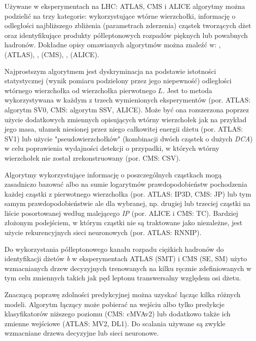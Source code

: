 Używane w eksperymentach na LHC: ATLAS, CMS i ALICE algorytmy można podzielić na trzy kategorie: wykorzystujące wtórne wierzchołki,  informację o odległości najbliższego zbliżenia (parametrach zderzenia)  cząstek tworzących dżet oraz identyfikujące produkty półleptonowych rozpadów pięknych lub powabnych hadronów. Dokładne opisy omawianych algorytmów można znaleźć w: \cite{Aad:2015ydr}, \cite{Sirunyan:2017ezt} (ATLAS), \cite{Chatrchyan:2012jua}, \cite{Sirunyan:2017ezt} (CMS), \cite{Feldkamp:2013cya}, \cite{Haake:2017dpr} (ALICE).

Najprostszym algorytmem jest dyskryminacja na podstawie istotności statystycznej (wynik pomiaru podzielony przez jego niepewność) odległości wtórnego wierzchołka od wierzchołka pierwotnego $L$. Jest to metoda wykorzystywana w  każdym z trzech wymienionych eksperymentów (por. ATLAS: algorytm SV0, CMS: algorytm SSV, ALICE). 
Może być ona rozszerzona poprzez użycie dodatkowych zmiennych opisujących wtórny wierzchołek jak na przykład jego masa, ułamek niesionej przez niego całkowitej energii dżetu (por. ATLAS: SV1) lub użycie "pseudowierzchołków" (kombinacji dwóch cząstek o dużych \textit{DCA}) w celu poprawienia wydajności detekcji o przypadki, w których wtórny wierzchołek nie został zrekonstruowany (por. CMS: CSV).

Algorytmy wykorzystujące informację o poszczególnych cząstkach mogą zasadniczo bazować albo na sumie logarytmów prawdopodobieństw pochodzenia każdej cząstki z pierwotnego wierzchołka (por. ATLAS: IP3D, CMS: JP) lub tym samym prawdopodobieństwie ale dla wybranej, np. drugiej lub trzeciej cząstki na liście posortowanej według malejącego \textit{IP} (por. ALICE i CMS: TC). Bardziej złożonym podejściem, w którym cząstki nie są traktowane jako niezależne, jest użycie rekurencyjnych sieci neuronowych (por. ATLAS: RNNIP).

Do wykorzystania półleptonowego kanału rozpadu ciężkich hadronów do identyfikacji dżetów \textit{b} w eksperymentach ATLAS (SMT) i CMS (SE, SM) użyto wzmacnianych drzew decyzyjnych trenowanych na kilku ręcznie zdefiniowanych w tym celu zmiennych takich jak pęd leptonu transwersalny względem osi dżetu.

Znaczącą poprawę zdolności predykcyjnej można uzyskać łącząc kilka różnych modeli. 
Algorytm łączący może pobierać na wejściu albo tylko predykcje klasyfikatorów niższego poziomu (CMS: cMVAv2) lub dodatkowo także ich zmienne wejściowe (ATLAS: MV2, DL1). Do scalania używane są zwykle wzmacniane drzewa decyzyjne lub sieci neuronowe.

